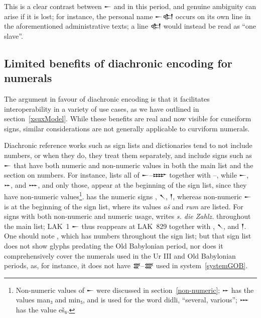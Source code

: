 \documentclass[10pt, a4paper, twoside]{article}
\newcommand\oneAšC{{\proposalfont\symbol{"12550}}} %
\newcommand\nineAšC{{\proposalfont\symbol{"12558}}} %
\begin{document}
This is a clear contrast between {\xsuxfont 𒀸} and {\oneAšC} in this period,
and genuine ambiguity can arise if it is lost; for instance, the personal name
{\xsuxfont 𒀸𒊕} occurs on its own line in the aforementioned administrative texts;
a line {\oneAšC\xsuxfont 𒊕} would instead be read as ``one slave''.

\subsection{Limited benefits of diachronic encoding for numerals}
\label{limitedBenefitsOfDiachrony}
The argument in favour of diachronic encoding is that it facilitates
interoperability in a variety of use cases,
as we have outlined in section~\ref{xsuxModel}.
While these benefits are real and now visible for cuneiform signs,
similar considerations are not generally applicable to curviform numerals.

Diachronic reference works such as sign lists and dictionaries tend to not include numbers,
or when they do, they treat them separately, and include signs such as {\xsuxfont 𒀸}
that have both numeric and non-numeric values in both the main list and the section on numbers.
For instance, \cite[123 \psqq]{Schneider1935} lists all of {\xsuxfont 𒀸}--{\xsuxfont 𒐇} together with
{\oneAšC}--{\nineAšC},
while {\xsuxfont 𒀸}, {\xsuxfont 𒐀}, and {\xsuxfont 𒐁}, and only those, appear at the beginning of the sign list,
since they have non-numeric values\footnote{Non-numeric values of {\xsuxfont 𒀸} were discussed in
section~\ref{non-numeric};
{\xsuxfont 𒐀} has the values man₃ and min₅, and is used for the word didli, ``several, various'';
{\xsuxfont 𒐁} has the value eš₆.}.
\cite[58]{Catagnoti2013} has the numeric signs {\oneAšC}, {\xsuxfont 𒀹}, {\xsuxfont 𒁹},
whereas non-numeric {\xsuxfont 𒀸} is at the beginning of the sign list,
where its values \emph{aš} and \emph{rum} are listed.
For signs with both non-numeric and numeric usage, \cite{Deimel1922} writes \emph{\textgerman{s. die Zahlz.}}
throughout the main list; LAK~1 {\xsuxfont 𒀸} thus reappears at LAK~829 together with
{\oneAšC}, {\xsuxfont 𒀹}, and {\xsuxfont 𒁹}.
One should note \cite{Borger2010}, which has numbers throughout the sign list;
but that sign list does not show glyphs predating the Old Babylonian period,
nor does it comprehensively cover the numerals used in the Ur III and Old Babylonian
periods, as, for instance, it does not have {\xsuxfont 𒐒}--{\xsuxfont 𒐔} used in
system~\ref{systemGOB}.
\end{document}
